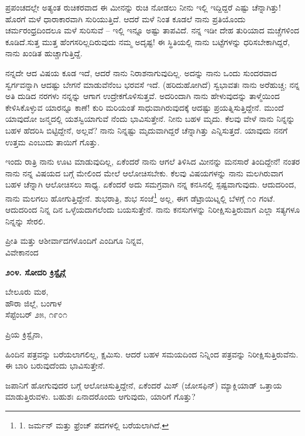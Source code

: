 ಪ್ರಪಂಚದಲ್ಲೇ ಅತ್ಯಂತ ರುಚಿಕರವಾದ ಈ ಮೀನನ್ನು ರುಚಿ ನೋಡಲು ನೀನು ಇಲ್ಲಿ ಇದ್ದಿದ್ದರೆ ಎಷ್ಟು ಚೆನ್ನಾಗಿತ್ತು! ಹೊರಗೆ ಮಳೆ ಧಾರಾಕಾರವಾಗಿ ಸುರಿಯುತ್ತಿದೆ. ಆದರೆ ಮಳೆ ನಿಂತ ಕೂಡಲೆ ನಾನು ಪ್ರತಿಯೊಂದು ಚರ್ಮರಂಧ್ರದಿಂದಲೂ ಮಳೆ ಸುರಿಸುವೆ – ಇಲ್ಲಿ ಇನ್ನೂ ಅಷ್ಟು ತಾಪವಿದೆ. ನನ್ನ ಇಡೀ ದೇಹ ತುರಿಯಾದ ಮಚ್ಚೆಗಳಿಂದ ಕೂಡಿದೆ.ಸುತ್ತ ಮುತ್ತ ಹೆಂಗಸರಿಲ್ಲದಿರುವುದು ನಮ್ಮ ಅದೃಷ್ಟ! ಈ ಸ್ಥಿತಿಯಲ್ಲಿ ನಾನು ಬಟ್ಟೆಗಳನ್ನು ಧರಿಸಬೇಕಾಗಿದ್ದರೆ, ನಾನು ಖಂಡಿತ ಹುಚ್ಚಾಗುತ್ತಿದ್ದೆ.

ನನ್ನದೇ ಆದ ವಿಷಯ ಕೂಡ ಇದೆ, ಆದರೆ ನಾನು ನಿರಾಶನಾಗುವುದಿಲ್ಲ. ಅದನ್ನು ನಾನು ಒಂದು ಸುಂದರವಾದ ಸ್ವರ್ಗವನ್ನಾಗಿ ಆದಷ್ಟು ಬೇಗನೆ ಮಾಡುವೆನೆಂಬ ಭರವಸೆ ಇದೆ. (ಹರಿದುಹೋಗಿದೆ) ಸ್ವಭಾವತಃ ನಾನು ಅರೆಹುಚ್ಚ; ನನ್ನ ಅತಿ ದುಡಿದ ನರಗಳು ನನ್ನನ್ನು ಆಗಾಗ ಉದ್ರೇಕಗೊಳಿಸುತ್ತವೆ. ಅದರಿಂದಾಗಿ ನಾನು ಹೇಳುವುದನ್ನು ತಾಳ್ಮೆಯಿಂದ ಕೇಳಿಸಿಕೊಳ್ಳುವ ಯಾರನ್ನೂ ಕಾಣೆ! ಕುರಿ ಮರಿಯಂತೆ ಸಾಧುವಾಗಿರುವುದಕ್ಕೆ ಆದಷ್ಟು ಪ್ರಯತ್ನಿಸುತ್ತಿದ್ದೇನೆ. ಮುಂದೆ ಯಾವುದೋ ಜನ್ಮದಲ್ಲಿ ಯಶಸ್ವಿಯಾಗುವೆ ನೆಂದು ಭಾವಿಸುತ್ತೇನೆ. ನೀನು ಬಹಳ ಮೃದು. ಕೆಲವು ವೇಳೆ ನಾನು ನಿನ್ನನ್ನು ಬಹಳ ಹೆದರಿಸಿ ಬಿಟ್ಟಿದ್ದೇನೆ, ಅಲ್ಲವೆ? ನಾನು ನಿನ್ನಷ್ಟು ಮೃದುವಾಗಿದ್ದರೆ ಚೆನ್ನಾಗಿತ್ತು ಎನ್ನಿಸುತ್ತದೆ. ಯಾವುದು ನನಗೆ ಉತ್ತಮ ಎಂಬುದು ತಾಯಿಗೆ ಗೊತ್ತು.

ಇಂದು ರಾತ್ರಿ ನಾನು ಊಟ ಮಾಡುವುದಿಲ್ಲ, ಏಕೆಂದರೆ ನಾನು ಆಗಲೆ ತಿಳಿಸಿದ ಮೀನನ್ನು ಮನಸಾರೆ ತಿಂದಿದ್ದೇನೆ! ನಂತರ ನಾನು ನನ್ನ ವಿಷಯದ ಬಗ್ಗೆ ಮೇಲಿಂದ ಮೇಲೆ ಆಲೋಚಿಸಬೇಕು. ಕೆಲವು ವಿಷಯಗಳನ್ನು ನಾನು ಮಲಗಿರುವಾಗ ಬಹಳ ಚೆನ್ನಾಗಿ ಆಲೋಚಿಸಲು ಸಾಧ್ಯ. ಏಕೆಂದರೆ ಅದು ಸಮಗ್ರವಾಗಿ ನನ್ನ ಕನಸಿನಲ್ಲಿ ಸ್ಪಷ್ಟವಾಗುವುದು. ಆದುದರಿಂದ, ನಾನು ಮಲಗಲು ಹೋಗುತ್ತಿದ್ದೇನೆ. ಶುಭರಾತ್ರಿ, ಶುಭ ಸಂಜೆ\footnote{1. ಜರ್ಮನ್ ಮತ್ತು ಫ್ರೆಂಚ್ ಪದಗಳಲ್ಲಿ ಬರೆಯಲಾಗಿದೆ.} ಅಲ್ಲ, ಈಗ ಡೆಟ್ರಾಯಿಟ್ನಲ್ಲಿ ಬೆಳಗ್ಗೆ ೧೦ ಗಂಟೆ. ಆದುದರಿಂದ ನಿನ್ನ ದಿನ ಒಳ್ಳೆಯದಾಗಲೆಂದು ಬಯಸುತ್ತೇನೆ. ನಾನು ಕನಸುಗಳನ್ನು ನಿರೀಕ್ಷಿಸುತ್ತಿರುವಾಗ ಎಲ್ಲಾ ಸತ್ಯಗಳೂ ನಿನ್ನನ್ನು ಸೇರಲಿ.

\begin{flushright}
ಪ್ರೀತಿ ಮತ್ತು ಆಶೀರ್ವಾದಗಳೊಂದಿಗೆ ಎಂದಿಗೂ ನಿನ್ನವ,\\ವಿವೇಕಾನಂದ
\end{flushright}

\begin{center}
\textbf{೨೦೪. ಸೋದರಿ ಕ್ರಿಸ್ಟೈನ್ಗೆ}
\end{center}

\begin{flushright}
ಬೇಲೂರು ಮಠ,\\ಹೌರಾ ಜಿಲ್ಲೆ, ಬಂಗಾಳ\\ಸೆಪ್ಟೆಂಬರ್ ೨೫, ೧೯೦೧
\end{flushright}

ಪ್ರಿಯ ಕ್ರಿಸ್ಟೈನಾ,

ಹಿಂದಿನ ಪತ್ರವನ್ನು ಬರೆಯಲಾಗಲಿಲ್ಲ, ಕ್ಷಮಿಸು. ಆದರೆ ಬಹಳ ಸಮಯದಿಂದ ನಿನ್ನಿಂದ ಪತ್ರವನ್ನು ನಿರೀಕ್ಷಿಸುತ್ತಿರುವೆನು. ಈ ಬಾರಿ ಬರುವುದೆಂದು ಭಾವಿಸುತ್ತೇನೆ.

ಜಪಾನಿಗೆ ಹೋಗುವುದರ ಬಗ್ಗೆ ಆಲೋಚಿಸುತ್ತಿದ್ದೇನೆ, ಏಕೆಂದರೆ ಮಿಸ್ (ಜೋಸಫಿನ್) ಮ್ಯಾಕ್ಲಿಯಾಡ್ ಒತ್ತಾಯ ಮಾಡುತ್ತಿರುವಳು. ಬಹುಶಃ ಏನಾದರೊಂದು ಆಗುವುದು, ಯಾರಿಗೆ ಗೊತ್ತು?

